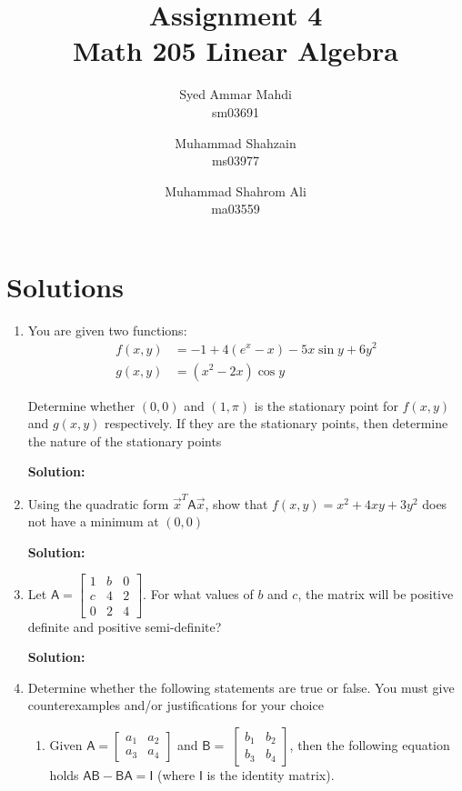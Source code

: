 \documentclass[a4paper, 11pt]{article}
\title{Assignment 4 \\ Math 205 Linear Algebra}
\author{Syed Ammar Mahdi \\sm03691 \and Muhammad Shahzain \\ms03977 \and Muhammad Shahrom Ali \\ma03559}
\newcommand{\mat}[1]{\boldsymbol { \mathsf{#1}} }
\begin{document}
\setlength{\parskip}{10pt} %
\setlength{\parindent}{0pt}
\maketitle

\section*{Solutions}
\begin{enumerate} 


\item You are given two functions:
\begin{align}
f(x,y) &= -1 + 4(e^x - x) - 5x\sin y + 6y^2 \\
g(x,y) &= (x^2 - 2x)\cos y
\end{align}

Determine whether $(0, 0)$ and $(1, \pi)$ is the stationary point for $f(x,y)$ and $g(x,y)$ respectively. If they are the stationary points, then determine the nature of the stationary points

\textbf{Solution:}



\item Using the quadratic form $\vec x^T \mat A \vec x$, show that $f(x, y) = x^2 + 4xy + 3y^2$ does not have a minimum at $(0, 0)$

\textbf{Solution:}


\item Let $\mat A = \begin{bmatrix} 1 & b & 0 \\ c & 4 & 2 \\ 0 & 2 & 4 \end{bmatrix}$. For what values of $b$ and $c$, the matrix will be positive definite and positive semi-definite?

\textbf{Solution:}


\item Determine whether the following statements are true or false. You must give counterexamples and/or justifications for your choice


\begin{enumerate}
    \item Given 
        $
        \mat{A} = 
        \begin{bmatrix}
        a_1 & a_2 \\
        a_3 & a_4
        \end{bmatrix}$  and 
        $
        \mat{B} = \;
        \begin{bmatrix}
        b_1 & b_2 \\
        b_3 & b_4
        \end{bmatrix}$, then the following equation holds
        $\mat{AB} - \mat{BA} = \mat{I}$ (where $\mat{I}$ is the identity matrix).
	

\end{enumerate}
\end{enumerate}
\end{document}
